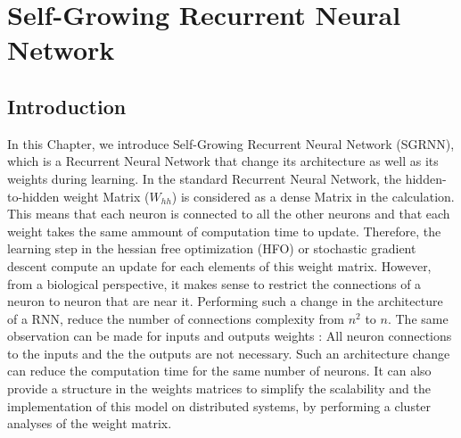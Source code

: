 
\chapter{ Self-Growing Recurrent Neural Network} %

\label{Chapter 2} %




\section{Introduction}

In this Chapter, we introduce Self-Growing Recurrent Neural Network (SGRNN), which is a Recurrent Neural Network that change its architecture as well as its weights during learning. In the standard Recurrent Neural Network, the hidden-to-hidden weight Matrix ($W_{hh}$) is considered as a dense Matrix in the calculation. This means that each neuron is connected to all the other neurons and that each weight takes the same ammount of computation time to update. Therefore, the learning step in the hessian free optimization (HFO) or stochastic gradient descent compute an update for each elements of this weight matrix. However, from a biological perspective, it makes sense to restrict the connections of a neuron to neuron that are near it. Performing such a change in the architecture of a RNN, reduce the number of connections complexity from $n^2$ to $n$. The same observation can be made for inputs and outputs weights : All neuron connections to the inputs and the the outputs are not necessary. Such an architecture change can reduce the computation time for the same number of neurons. It can also provide a structure in the weights matrices to simplify the scalability and the implementation of this model on distributed systems, by performing a cluster analyses of the weight matrix.

